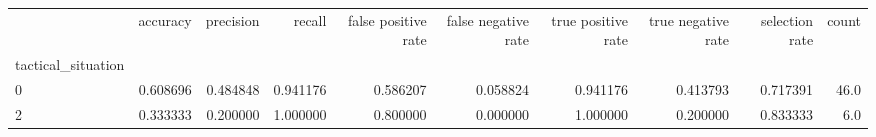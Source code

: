\begin{tabular}{lrrrrrrrrr}
\toprule
{} &  accuracy &  precision &    recall &  false positive rate &  false negative rate &  true positive rate &  true negative rate &  selection rate &  count \\
tactical\_situation &           &            &           &                      &                      &                     &                     &                 &        \\
\midrule
0                  &  0.608696 &   0.484848 &  0.941176 &             0.586207 &             0.058824 &            0.941176 &            0.413793 &        0.717391 &   46.0 \\
2                  &  0.333333 &   0.200000 &  1.000000 &             0.800000 &             0.000000 &            1.000000 &            0.200000 &        0.833333 &    6.0 \\
\bottomrule
\end{tabular}
